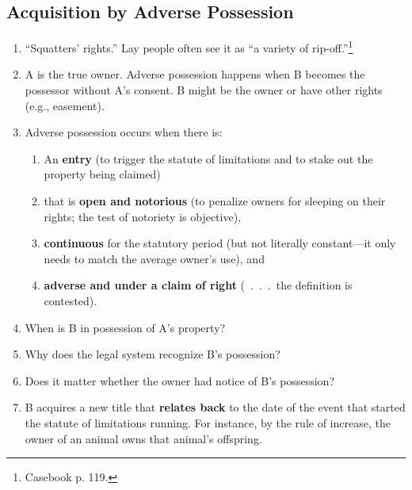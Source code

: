 % 

\subsection{Acquisition by Adverse Possession}

\begin{enumerate}
    \item ``Squatters' rights.'' Lay people often see it as ``a variety of 
    rip-off.''\footnote{Casebook p. 119.}
    \item A is the true owner. Adverse possession happens when B becomes the 
    possessor without A's consent. B might be the owner or have other rights 
    (e.g., easement).
    \item Adverse possession occurs when there is:
    \begin{enumerate}
        \item An \textbf{entry} (to trigger the statute of limitations and to 
        stake out the property being claimed)
        \item that is \textbf{open and notorious} (to penalize owners for 
        sleeping on their rights; the test of notoriety is objective),
        \item \textbf{continuous} for the statutory period (but not literally 
        constant---it only needs to match the average owner's use), and
        \item \textbf{adverse and under a claim of right} (~.~.~.~the 
        definition is contested).
    \end{enumerate}
    \item When is B in possession of A's property?
    \item Why does the legal system recognize B's possession?
    \item Does it matter whether the owner had notice of B's possession?
    \item B acquires a new title that \textbf{relates back} to the date of the 
    event that started the statute of limitations running. For instance, by 
    the rule of increase, the owner of an animal owns that animal's offspring. 

\end{enumerate}
